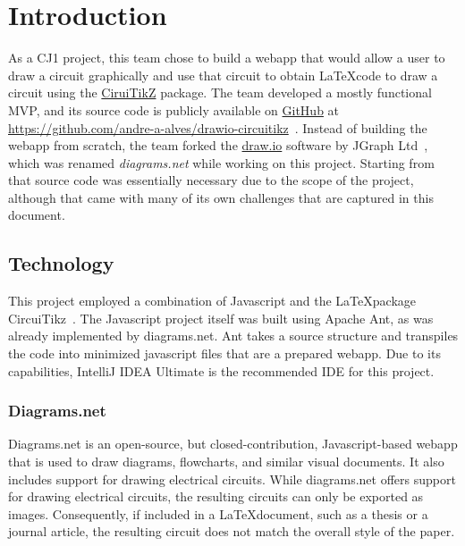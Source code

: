 %
\chapter{Introduction}\label{ch:introduction}
As a CJ1 project, this team chose to build a webapp that would allow a user to draw a circuit graphically and use that circuit to obtain \LaTeX code to draw a circuit using the \href{https://github.com/circuitikz/circuitikz}{CiruiTikZ} package.
The team developed a mostly functional MVP, and its source code is publicly available on \href{https://github.com/andre-a-alves/drawio-circuitikz}{GitHub} at \href{https://github.com/andre-a-alves/drawio-circuitikz}{https://github.com/andre-a-alves/drawio-circuitikz}~\cite{sourcecode}.
Instead of building the webapp from scratch, the team forked the \href{https://github.com/jgraph/drawio}{draw.io} software by JGraph Ltd~\cite{drawioCode}, which was renamed \emph{diagrams.net} while working on this project.
Starting from that source code was essentially necessary due to the scope of the project, although that came with many of its own challenges that are captured in this document.

\section{Technology}\label{sec:technology}
This project employed a combination of Javascript and the \LaTeX package CircuiTikz~\cite{circuitikz}.
The Javascript project itself was built using Apache Ant, as was already implemented by diagrams.net.
Ant takes a source structure and transpiles the code into minimized javascript files that are a prepared webapp.
Due to its capabilities, IntelliJ IDEA Ultimate is the recommended IDE for this project.

\subsection{Diagrams.net}\label{subsec:diagrams-net}
Diagrams.net is an open-source, but closed-contribution, Javascript-based webapp that is used to draw diagrams, flowcharts, and similar visual documents.
It also includes support for drawing electrical circuits.
While diagrams.net offers support for drawing electrical circuits, the resulting circuits can only be exported as images.
Consequently, if included in a \LaTeX document, such as a thesis or a journal article, the resulting circuit does not match the overall style of the paper.

